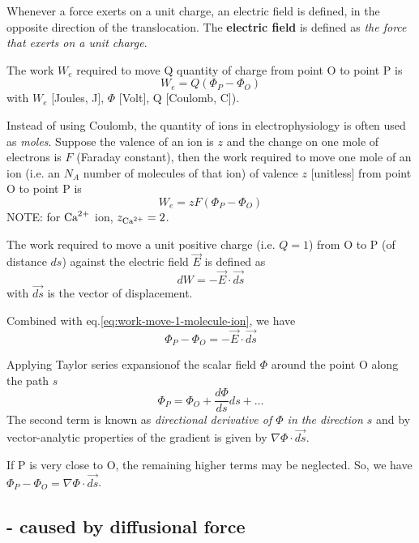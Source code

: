 Whenever a force exerts on a unit charge, an electric field is defined, in the
opposite direction of the translocation. The {\bf electric field} is defined as
{\it the force that exerts on a unit charge}.

The work $W_e$ required to move Q quantity of charge from
point O to point P is
\begin{equation}
W_e = Q (\Phi_P - \Phi_O)
\end{equation}
with $W_e$ [Joules, J], $\Phi$ [Volt], Q [Coulomb, C]). 

\begin{mdframed}
Instead of using Coulomb, the quantity of ions in electrophysiology is often
used as {\it moles}. Suppose the valence of an ion is $z$ and the change on one
mole of electrons is $F$ (Faraday constant), then the work required to move one
mole of an ion (i.e. an $N_A$ number of molecules of
that ion) of valence $z$ [unitless] from point O to point P is
\begin{equation}
W_e = zF (\Phi_P - \Phi_O)
\end{equation}
NOTE: for ${\text{Ca}^{2+}}$ ion, $z_{\text{Ca}^{2+}} = 2$.

\end{mdframed}

The work required to move a unit positive charge (i.e. $Q=1$) from O to P (of
distance $ds$) against the electric field $\vec{E}$ is defined as
\begin{equation}
dW = - \vec{E} \cdot \vec{ds}
\end{equation}
with $\vec{ds}$ is the vector of displacement.


Combined with eq.\ref{eq:work-move-1-molecule-ion}, we have
\begin{equation}
\Phi_P - \Phi_O = - \vec{E} \cdot \vec{ds}
\end{equation}

Applying Taylor series expansionof the scalar field $\Phi$ around the point O
along the path $s$
\begin{equation}
\Phi_P = \Phi_O + \frac{d\Phi}{ds} ds + \ldots
\end{equation}
The second term is known as {\it directional derivative of $\Phi$ in the
direction $s$} and by vector-analytic properties of the gradient is given by
$\nabla \Phi \cdot \vec{ds}$. 

If P is very close to O, the remaining higher terms may be neglected. So, we
have $\Phi_P - \Phi_O = \nabla \Phi \cdot \vec{ds}$.


\subsection{- caused by diffusional force}
\label{sec:flow-by-diffusional-force}

